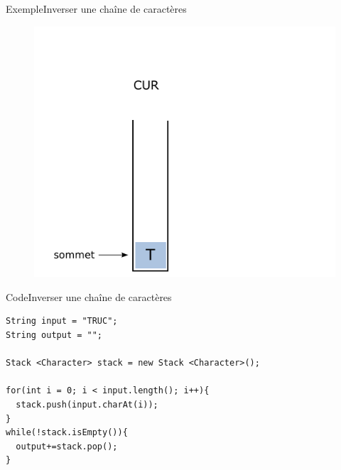 \documentclass[12pt,a4paper]{beamer}
\begin{document}
\begin{frame}{Exemple}{Inverser une chaîne de caractères}
{\begin{figure}
\includegraphics[scale=1]{figs/stack_cur}
\end{figure}
}

\end{frame}


\begin{frame}[fragile]{Code}{Inverser une chaîne de caractères}
\begin{lstlisting}
String input = "TRUC";
String output = "";

Stack <Character> stack = new Stack <Character>();

for(int i = 0; i < input.length(); i++){
  stack.push(input.charAt(i));
}
while(!stack.isEmpty()){
  output+=stack.pop();  
}

\end{lstlisting}

\end{frame}
\end{document}
